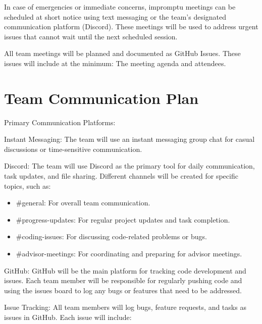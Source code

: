 \documentclass{article}
\begin{document}
In case of emergencies or immediate concerns, impromptu meetings can be scheduled at short notice using text messaging or the team’s designated communication platform (Discord). These meetings will be used to address urgent issues that cannot wait until the next scheduled session.

All team meetings will be planned and documented as GitHub Issues. These issues will include at the minimum: The meeting agenda and attendees.

\section{Team Communication Plan}

Primary Communication Platforms:\par

\begin{flushleft}
  Instant Messaging: The team will use an instant messaging group chat for casual discussions or time-sensitive communication.\par

  Discord: The team will use Discord as the primary tool for daily communication, task updates, and file sharing. Different channels will be created for specific topics, such as:
\end{flushleft}

\begin{itemize}
    \item \#general: For overall team communication.
    \item \#progress-updates: For regular project updates and task completion.
    \item \#coding-issues: For discussing code-related problems or bugs.
    \item \#advisor-meetings: For coordinating and preparing for advisor meetings.
\end{itemize}

\begin{flushleft}
  GitHub: GitHub will be the main platform for tracking code development and issues. Each team member will be responsible for regularly pushing code and using the issues board to log any bugs or features that need to be addressed.\par

  Issue Tracking: All team members will log bugs, feature requests, and tasks as issues in GitHub. Each issue will include:
\end{flushleft}
\end{document}
